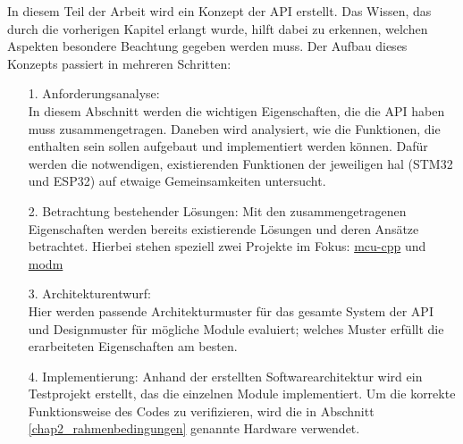 In diesem Teil der Arbeit wird ein Konzept der API erstellt.
Das Wissen, das durch die vorherigen Kapitel erlangt wurde, hilft dabei zu erkennen, welchen Aspekten besondere Beachtung gegeben werden muss.
Der Aufbau dieses Konzepts passiert in mehreren Schritten:
\begin{itemize}
	\item [1.]  Anforderungsanalyse: \\In diesem Abschnitt werden die wichtigen Eigenschaften, die die API haben muss zusammengetragen. Daneben wird analysiert, wie die Funktionen, die enthalten sein sollen aufgebaut und implementiert werden können. Dafür werden die notwendigen, existierenden Funktionen der jeweiligen \gls{hal} (STM32 und ESP32) auf etwaige Gemeinsamkeiten untersucht.
 	\item [2.] 	Betrachtung bestehender Lösungen: Mit den zusammengetragenen Eigenschaften werden bereits existierende Lösungen und deren Ansätze betrachtet. Hierbei stehen speziell zwei Projekte im Fokus: \href{https://github.com/yh-sb/mcu-cpp.git}{mcu-cpp}\cite{github_mcu_cpp} und \href{https://github.com/modm-io/modm.git}{modm}\cite{github_modm}
	\item [3.] Architekturentwurf: \\Hier werden passende Architekturmuster für das gesamte System der API und Designmuster für mögliche Module evaluiert; welches Muster erfüllt die erarbeiteten Eigenschaften am besten.
	\item [4.] Implementierung: Anhand der erstellten Softwarearchitektur wird ein Testprojekt erstellt, das die einzelnen Module implementiert. Um die korrekte Funktionsweise des Codes zu verifizieren, wird die in Abschnitt \ref{chap2_rahmenbedingungen} genannte Hardware verwendet. 
\end{itemize}

